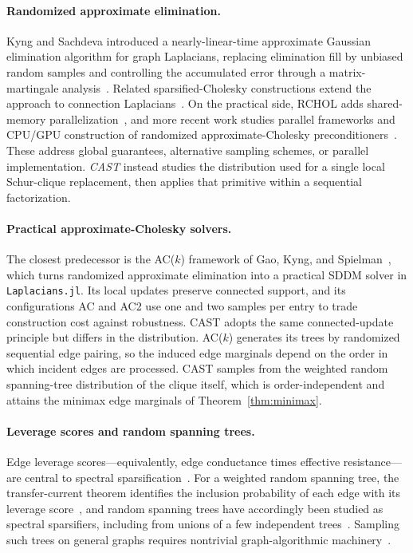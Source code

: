 \documentclass{article}
\newcommand{\CAST}{\textit{CAST}\xspace}
\newcommand{\1}{\mathbbm{1}}
\theoremstyle{plain}
\begin{document}
\paragraph{Randomized approximate elimination.}
Kyng and Sachdeva introduced a nearly-linear-time approximate Gaussian
elimination algorithm for graph Laplacians, replacing elimination fill
by unbiased random samples and controlling the accumulated error
through a matrix-martingale analysis~\cite{kyng2016approximate}.
Related sparsified-Cholesky constructions extend the approach to
connection Laplacians~\cite{kyng2016sparsified}. On the practical
side, \textsf{RCHOL} adds shared-memory
parallelization~\cite{chen2021rchol}, and more recent work studies
parallel frameworks and CPU/GPU construction of randomized
approximate-Cholesky
pre\-conditioners~\cite{baumann2024framework,liang2025parallel}. These
address global guarantees, alternative sampling schemes, or parallel
implementation. \CAST{} instead studies the distribution used for a
single local Schur-clique replacement, then applies that primitive
within a sequential factorization.

\paragraph{Practical approximate-Cholesky solvers.}
The closest predecessor is the AC($k$) framework of Gao, Kyng, and
Spielman~\cite{AC}, which turns randomized approximate elimination
into a practical SDDM solver in \texttt{Laplacians.jl}. Its local
updates preserve connected support, and its configurations AC and AC2
use one and two samples per entry to trade construction cost against
robustness. CAST adopts the same connected-update principle but
differs in the distribution. AC($k$) generates its trees by randomized
sequential edge pairing, so the induced edge marginals depend on the
order in which incident edges are processed. CAST samples from the
weighted random spanning-tree distribution of the clique itself, which
is order-independent and attains the minimax edge marginals of
Theorem~\ref{thm:minimax}.

\paragraph{Leverage scores and random spanning trees.}
Edge leverage scores---equivalently, edge conductance times effective
resistance---are central to spectral
sparsification~\cite{spielman2008graph}. For a weighted random
spanning tree, the transfer-current theorem identifies the inclusion
probability of each edge with its leverage
score~\cite{lyons2003determinantal}, and random spanning trees have
accordingly been studied as spectral sparsifiers, including from
unions of a few independent trees~\cite{kyng2018matrix}. Sampling such
trees on general graphs requires nontrivial graph-algorithmic
machinery~\cite{durfee2017sampling}.
\end{document}
